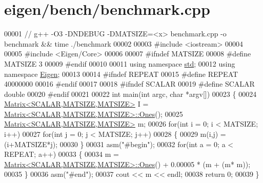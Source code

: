\hypertarget{eigen_2bench_2benchmark_8cpp_source}{}\section{eigen/bench/benchmark.cpp}
\label{eigen_2bench_2benchmark_8cpp_source}

\begin{DoxyCode}
00001 \textcolor{comment}{// g++ -O3 -DNDEBUG -DMATSIZE=<x> benchmark.cpp -o benchmark && time ./benchmark}
00002 
00003 \textcolor{preprocessor}{#include <iostream>}
00004 
00005 \textcolor{preprocessor}{#include <Eigen/Core>}
00006 
00007 \textcolor{preprocessor}{#ifndef MATSIZE}
00008 \textcolor{preprocessor}{#define MATSIZE 3}
00009 \textcolor{preprocessor}{#endif}
00010 
00011 \textcolor{keyword}{using namespace }\hyperlink{namespacestd}{std};
00012 \textcolor{keyword}{using namespace }\hyperlink{namespace_eigen}{Eigen};
00013 
00014 \textcolor{preprocessor}{#ifndef REPEAT}
00015 \textcolor{preprocessor}{#define REPEAT 40000000}
00016 \textcolor{preprocessor}{#endif}
00017 
00018 \textcolor{preprocessor}{#ifndef SCALAR}
00019 \textcolor{preprocessor}{#define SCALAR double}
00020 \textcolor{preprocessor}{#endif}
00021 
00022 \textcolor{keywordtype}{int} main(\textcolor{keywordtype}{int} argc, \textcolor{keywordtype}{char} *argv[])
00023 \{
00024     \hyperlink{group___core___module_class_eigen_1_1_matrix}{Matrix<SCALAR,MATSIZE,MATSIZE>} I = 
      \hyperlink{group___core___module_class_eigen_1_1_matrix}{Matrix<SCALAR,MATSIZE,MATSIZE>::Ones}();
00025     \hyperlink{group___core___module_class_eigen_1_1_matrix}{Matrix<SCALAR,MATSIZE,MATSIZE>} m;
00026     \textcolor{keywordflow}{for}(\textcolor{keywordtype}{int} i = 0; i < MATSIZE; i++)
00027         \textcolor{keywordflow}{for}(\textcolor{keywordtype}{int} j = 0; j < MATSIZE; j++)
00028         \{
00029             m(i,j) = (i+MATSIZE*j);
00030         \}
00031     \textcolor{keyword}{asm}(\textcolor{stringliteral}{"#begin"});
00032     \textcolor{keywordflow}{for}(\textcolor{keywordtype}{int} a = 0; a < REPEAT; a++)
00033     \{
00034         m = \hyperlink{group___core___module_class_eigen_1_1_matrix}{Matrix<SCALAR,MATSIZE,MATSIZE>::Ones}() + 0.00005 * (m + (m*
      m));
00035     \}
00036     \textcolor{keyword}{asm}(\textcolor{stringliteral}{"#end"});
00037     cout << m << endl;
00038     \textcolor{keywordflow}{return} 0;
00039 \}
\end{DoxyCode}
